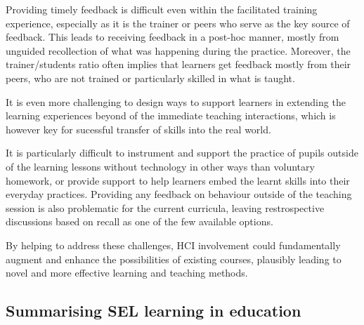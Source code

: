 \documentclass[prodmode,acmtochi]{acmsmall}
\begin{document}
Providing timely feedback is difficult even within the facilitated training experience, especially as it is the trainer or peers who serve as the key source of feedback. This leads to receiving feedback in a post-hoc manner, mostly from unguided recollection of what was happening during the practice. Moreover, the trainer/students ratio often implies that learners get feedback mostly from their peers, who are not trained or particularly skilled in what is taught.  

It is even more challenging to design ways to support learners in extending the learning experiences beyond of the immediate teaching interactions, which is however key for sucessful transfer of skills into the real world. 

It is particularly difficult to instrument and support the practice of pupils outside of the learning lessons without technology in other ways than voluntary homework, or provide support to help learners embed the learnt skills into their everyday practices. Providing any feedback on behaviour outside of the teaching session is also problematic for the current curricula, leaving restrospective discussions based on recall as one of the few available options. 

By helping to address these challenges, HCI involvement could fundamentally augment and enhance the possibilities of existing courses, plausibly leading to novel and more effective learning and teaching methods. 



\fi



\subsection{Summarising SEL learning in education}
\end{document}
